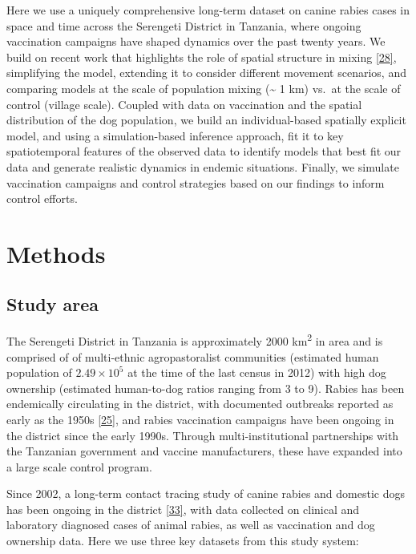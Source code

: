 \documentclass[
  oneside]{book}
\begin{document}
Here we use a uniquely comprehensive long-term dataset on canine rabies cases in space and time across the Serengeti District in Tanzania, where ongoing vaccination campaigns have shaped dynamics over the past twenty years. We build on recent work that highlights the role of spatial structure in mixing \protect\hyperlink{ref-Mancyinprep}{{[}28{]}}, simplifying the model, extending it to consider different movement scenarios, and comparing models at the scale of population mixing (\textasciitilde{} 1 km) vs.~at the scale of control (village scale). Coupled with data on vaccination and the spatial distribution of the dog population, we build an individual-based spatially explicit model, and using a simulation-based inference approach, fit it to key spatiotemporal features of the observed data to identify models that best fit our data and generate realistic dynamics in endemic situations. Finally, we simulate vaccination campaigns and control strategies based on our findings to inform control efforts.

\hypertarget{methods-2}{%
\section{Methods}\label{methods-2}}

\hypertarget{study-area}{%
\subsection{Study area}\label{study-area}}

The Serengeti District in Tanzania is approximately 2000 km\textsuperscript{2} in area and is comprised of of multi-ethnic agropastoralist communities (estimated human population of \ensuremath{2.49\times 10^{5}} at the time of the last census in 2012) with high dog ownership (estimated human-to-dog ratios ranging from 3 to 9). Rabies has been endemically circulating in the district, with documented outbreaks reported as early as the 1950s \protect\hyperlink{ref-brunker2015}{{[}25{]}}, and rabies vaccination campaigns have been ongoing in the district since the early 1990s. Through multi-institutional partnerships with the Tanzanian government and vaccine manufacturers, these have expanded into a large scale control program.

Since 2002, a long-term contact tracing study of canine rabies and domestic dogs has been ongoing in the district \protect\hyperlink{ref-Hampson2009}{{[}33{]}}, with data collected on clinical and laboratory diagnosed cases of animal rabies, as well as vaccination and dog ownership data. Here we use three key datasets from this study system:
\end{document}
